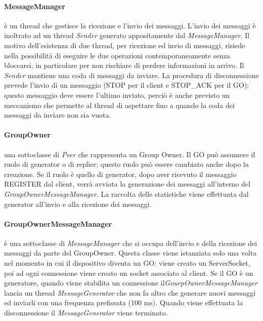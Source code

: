 \documentclass{llncs}
\begin{document}
\paragraph{MessageManager} è un thread che gestisce la ricezione e l'invio dei messaggi. L'invio dei messaggi è inoltrato ad un thread \emph{Sender} generato appositamente dal \emph{MessageManager}. Il motivo dell'esistenza di due thread, per ricezione ed invio di messaggi, risiede nella possibilità di eseguire le due operazioni contemporaneamente senza bloccarsi, in particolare per non rischiare di perdere informazioni in arrivo. Il \emph{Sender} mantiene 
una coda di messaggi da inviare. La procedura di disconnessione prevede l'invio di un messaggio (STOP per il client e STOP\_ACK per il GO); questo messaggio deve essere l'ultimo inviato, perciò è anche previsto un meccanismo che 
permette al thread di aspettare fino a quando la coda dei messaggi da inviare non sia vuota.

\paragraph{GroupOwner} una sottoclasse di \emph{Peer} che rappresenta un Group Owner. Il GO può assumere il ruolo di generator o di replier; questo ruolo può essere cambiato anche dopo la creazione. Se il ruolo è quello di generator, 
dopo aver ricevuto il messaggio REGISTER dal client, verrà avviata la generazione dei messaggi all'interno del \emph{GroupOwnerMessageManager}. La raccolta delle statistiche viene effettuata dal generator all'invio e alla ricezione dei messaggi.

\paragraph{GroupOwnerMessageManager} è una sottoclasse di \emph{MessageManager} che si occupa dell'invio e della ricezione dei messaggi da parte del GroupOwner. Questa classe viene istanziata solo una volta nel momento in cui 
il dispositivo diventa un GO: viene creato un ServerSocket, poi ad ogni connessione viene creato un socket associato al client. Se il GO è un generatore, quando viene stabilita un connessione il\emph{GourpOwnerMessageManager} lancia 
un thread \emph{MessageGenerator} che non fa altro che generare nuovi messaggi ed inviarli con una frequenza prefissata (100 ms). Quando viene effettuata la disconnessione il \emph{MessageGenerator} viene terminato.
\end{document}
